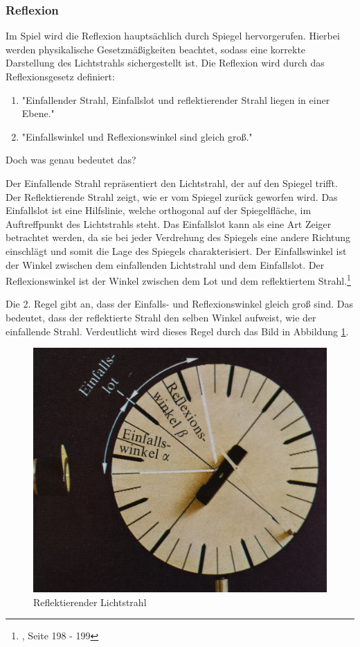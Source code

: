 \subsubsection{Reflexion}
Im Spiel wird die Reflexion hauptsächlich durch Spiegel hervorgerufen. Hierbei werden physikalische Gesetzmäßigkeiten beachtet, sodass eine korrekte Darstellung des Lichtstrahls sichergestellt ist. Die Reflexion wird durch das Reflexionsgesetz definiert:
\begin{enumerate}
\item "{}Einfallender Strahl, Einfallslot und reflektierender Strahl liegen in einer Ebene."{}
\item "{}Einfallswinkel und Reflexionswinkel sind gleich groß."{}\cite{baderdorn1980}
\end{enumerate}
Doch was genau bedeutet das?

Der Einfallende Strahl repräsentiert den Lichtstrahl, der auf den Spiegel trifft. Der Reflektierende Strahl zeigt, wie er vom Spiegel zurück geworfen wird. Das Einfallslot ist eine Hilfslinie, welche orthogonal auf der Spiegelfläche, im Auftreffpunkt des Lichtstrahls steht. Das Einfallslot kann als eine Art Zeiger betrachtet werden, da sie bei jeder Verdrehung des Spiegels eine andere Richtung einschlägt und somit die Lage des Spiegels charakterisiert. Der Einfallswinkel ist der Winkel zwischen dem einfallenden Lichtstrahl und dem Einfallslot. Der Reflexionswinkel ist der Winkel zwischen dem Lot und dem reflektiertem Strahl.\footnote{\cite{baderdorn1980}, Seite 198 - 199}

Die 2. Regel gibt an, dass der Einfalls- und Reflexionswinkel gleich groß sind. Das bedeutet, dass der reflektierte Strahl den selben Winkel aufweist, wie der einfallende Strahl. Verdeutlicht wird dieses Regel durch das Bild in Abbildung \ref{reflecWinkel}.
\begin{figure}[H]
    \centering
    \includegraphics[scale=0.09, center]{res/reflecWinkel.jpg}
    \caption[Reflektierender Lichtstrahl]{Reflektierender Lichtstrahl\footnotemark}
    \label{reflecWinkel}
\end{figure}

